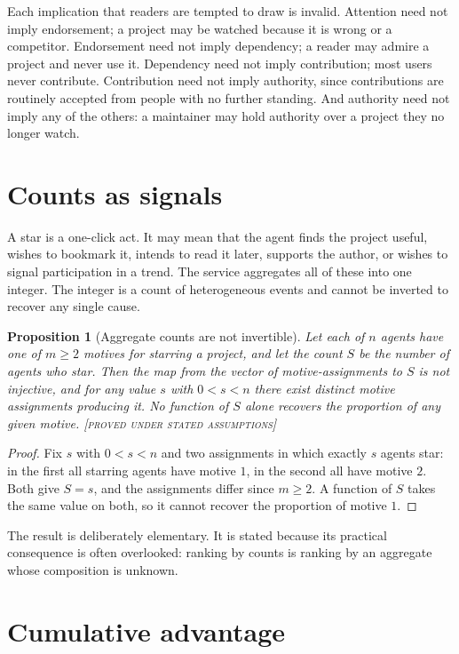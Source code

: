 \documentclass[11pt,twoside,openright]{book}
\theoremstyle{plain}
\newtheorem{proposition}[theorem]{Proposition}
\theoremstyle{definition}
\theoremstyle{remark}
\newcommand{\Proved}{\textup{\textsc{[proved under stated assumptions]}}}
\begin{document}
Each implication that readers are tempted to draw is invalid. Attention need not imply endorsement; a project may be watched because it is wrong or a competitor. Endorsement need not imply dependency; a reader may admire a project and never use it. Dependency need not imply contribution; most users never contribute. Contribution need not imply authority, since contributions are routinely accepted from people with no further standing. And authority need not imply any of the others: a maintainer may hold authority over a project they no longer watch.

\section{Counts as signals}

A star is a one-click act. It may mean that the agent finds the project useful, wishes to bookmark it, intends to read it later, supports the author, or wishes to signal participation in a trend. The service aggregates all of these into one integer. The integer is a count of heterogeneous events and cannot be inverted to recover any single cause.

\begin{proposition}[Aggregate counts are not invertible]\label{prop:count}
Let each of $n$ agents have one of $m\ge2$ motives for starring a project, and let the count $S$ be the number of agents who star. Then the map from the vector of motive-assignments to $S$ is not injective, and for any value $s$ with $0<s<n$ there exist distinct motive assignments producing it. No function of $S$ alone recovers the proportion of any given motive.
\Proved{}
\end{proposition}

\begin{proof}
Fix $s$ with $0<s<n$ and two assignments in which exactly $s$ agents star: in the first all starring agents have motive $1$, in the second all have motive $2$. Both give $S=s$, and the assignments differ since $m\ge 2$. A function of $S$ takes the same value on both, so it cannot recover the proportion of motive $1$.
\end{proof}

The result is deliberately elementary. It is stated because its practical consequence is often overlooked: ranking by counts is ranking by an aggregate whose composition is unknown.

\section{Cumulative advantage}
\end{document}

